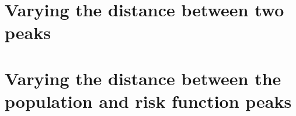 \section{Varying the distance between two peaks}


\section{Varying the distance between the population and risk function peaks}


